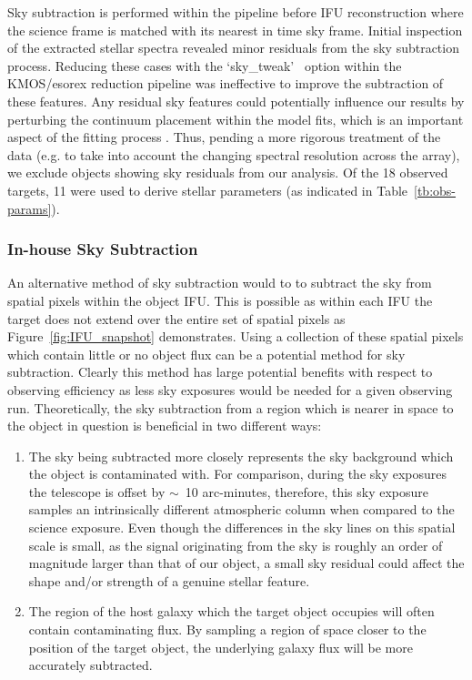 Sky subtraction is performed within the pipeline before IFU reconstruction where the science frame is matched with its nearest in time sky frame.
Initial inspection of the extracted stellar spectra revealed minor residuals from the sky subtraction process.
Reducing these cases with the \textquoteleft sky\_tweak\textquoteright
~option within the KMOS/esorex reduction pipeline was ineffective to improve the subtraction of these features.
Any residual sky features could potentially influence our results by perturbing the continuum placement within the model fits, which is an important aspect of the fitting process
\citep[see][for more discussion]{2014ApJ...788...58G,2015ApJ...806...21D}.
Thus, pending a more rigorous treatment of the data
(e.g. to take into account the changing spectral resolution across the array),
we exclude objects showing sky residuals from our analysis.
Of the 18 observed targets, 11 were used to derive stellar parameters
(as indicated in Table~\ref{tb:obs-params}).

\subsubsection{In-house Sky Subtraction} %
\label{sub:in_house_sky_subtraction}

An alternative method of sky subtraction would to to subtract the sky from spatial pixels within the object IFU.
This is possible as within each IFU the target does not extend over the entire set of spatial pixels as Figure~\ref{fig:IFU_snapshot} demonstrates.
Using a collection of these spatial pixels which contain little or no object flux can be a potential method for sky subtraction.
Clearly this method has large potential benefits with respect to observing efficiency as less sky exposures would be needed for a given observing run.
Theoretically, the sky subtraction from a region which is nearer in space to the object in question is beneficial in two different ways:
\begin{enumerate}
  \item The sky being subtracted more closely represents the sky background which the object is contaminated with.
For comparison, during the sky exposures the telescope is offset by $\sim$~10 arc-minutes, therefore, this sky exposure samples an intrinsically different atmospheric column when compared to the science exposure.
Even though the differences in the sky lines on this spatial scale is small, as the signal originating from the sky is roughly an order of magnitude larger than that of our object, a small sky residual could affect the shape and/or strength of a genuine stellar feature.
\item The region of the host galaxy which the target object occupies will often contain contaminating flux.
By sampling a region of space closer to the position of the target object, the underlying galaxy flux will be more accurately subtracted.
\end{enumerate}

